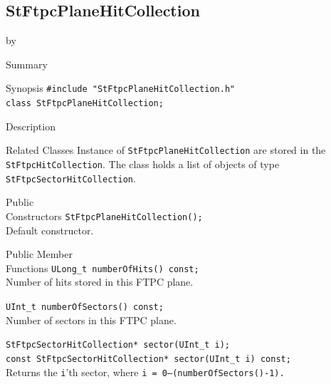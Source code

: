 \documentclass[twoside]{article}
\newcommand{\entrylabel}[1]{\mbox{\textbf{{#1}}}\hfil}%
\newenvironment{entry}
{\begin{list}{}%
    {\renewcommand{\makelabel}{\entrylabel}%
     \setlength{\labelwidth}{90pt}%
     \setlength{\leftmargin}{\labelwidth}
     \advance\leftmargin by \labelsep%
      }%
    }%
  {\end{list}}
\newcommand{\Entrylabel}[1]%
{\raisebox{0pt}[1ex][0pt]{\makebox[\labelwidth][l]%
    {\parbox[t]{\labelwidth}{\hspace{0pt}\textbf{{#1}}}}}}
\newenvironment{Entry}%
{\renewcommand{\entrylabel}{\Entrylabel}\begin{entry}}%
  {\end{entry}}
\begin{document}
\subsection{StFtpcPlaneHitCollection}
\label{sec:StFtpcPlaneHitCollection}
\begin{Entry}
\item[Summary]
    
\item[Synopsis]
    \verb+#include "StFtpcPlaneHitCollection.h"+\\
    \verb+class StFtpcPlaneHitCollection;+\\
\item[Description]
    
\item[Related Classes] Instance of \texttt{StFtpcPlaneHitCollection}
    are stored in the \texttt{StFtpcHitCollection}.  The class holds a
    list of objects of type \texttt{StFtpcSectorHitCollection}.
   
\item[Public\\ Constructors]
    \verb+StFtpcPlaneHitCollection();+\\
    Default constructor.
    
\item[Public Member\\ Functions]
    \verb+ULong_t numberOfHits() const;+\\
    Number of hits stored in this FTPC plane.
    
    \verb+UInt_t numberOfSectors() const;+\\
    Number of sectors in this FTPC plane.
    
    \verb+StFtpcSectorHitCollection* sector(UInt_t i);+\\
    \verb+const StFtpcSectorHitCollection* sector(UInt_t i) const;+\\
    Returns the \texttt{i}'th sector, where \texttt{i =
        0--(numberOfSectors()-1).}
\end{Entry}
\clearpage
\end{document}
